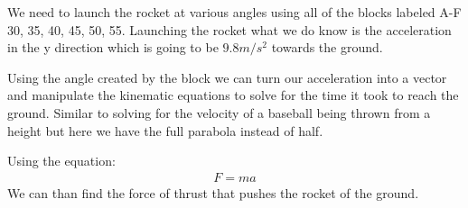 \documentclass{article}
\begin{document}
    We need to launch the rocket at various angles using all of the blocks labeled A-F 30, 35, 40, 45, 50, 55. Launching the rocket what we do know is the acceleration in the y direction which is going to be $9.8 m/s^2$ towards the ground.

    Using the angle created by the block we can turn our acceleration into a vector and manipulate the kinematic equations to solve for the time it took to reach the ground. Similar to solving for the velocity of a baseball being thrown from a height but here we have the full parabola instead of half.

    Using the equation:
    \begin{align*}
        F = ma
    \end{align*}
    We can than find the force of thrust that pushes the rocket of the ground.
 
\end{document}

